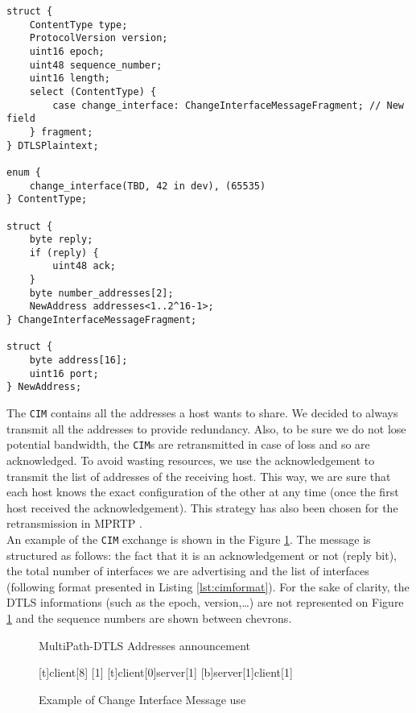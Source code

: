 \begin{lstlisting}[caption=Change Interface Message structure, label=lst:cimformat]
struct {
    ContentType type;
    ProtocolVersion version;
    uint16 epoch;
    uint48 sequence_number;
    uint16 length;
    select (ContentType) {
        case change_interface: ChangeInterfaceMessageFragment; // New field
    } fragment;
} DTLSPlaintext;

enum {
    change_interface(TBD, 42 in dev), (65535)
} ContentType;

struct {
    byte reply;
    if (reply) {
        uint48 ack;
    }
    byte number_addresses[2];
    NewAddress addresses<1..2^16-1>;
} ChangeInterfaceMessageFragment;

struct {
    byte address[16];
    uint16 port;
} NewAddress;
\end{lstlisting}

The \texttt{CIM} contains all the addresses a host wants to share. We decided to always transmit all the addresses to provide redundancy. Also, to be sure we do not lose potential bandwidth, the \texttt{CIM}s are retransmitted in case of loss and so are acknowledged. To avoid wasting resources, we use the acknowledgement to transmit the list of addresses of the receiving host. This way, we are sure that each host knows the exact configuration of the other at any time (once the first host received the acknowledgement). This strategy has also been chosen for the retransmission in MPRTP \cite{singh-avtcore-mprtp}.\\

An example of the \texttt{CIM} exchange is shown in the Figure \ref{fig:CIMexchange}. The message is structured as follows: the fact that it is an acknowledgement or not (reply bit), the total number of interfaces we are advertising and the list of interfaces (following format presented in Listing \ref{lst:cimformat}). For the sake of clarity, the DTLS informations (such as the epoch, version,\dots) are not represented on Figure \ref{fig:CIMexchange} and the sequence numbers are shown between chevrons.

\begin{figure}[!h]
\centering
\begin{msc}[r]{MultiPath-DTLS Addresses announcement}

\setlength{\instfootheight}{0em}
\setlength{\instheadheight}{0em}
\setlength{\instdist}{0.7\linewidth}
\setlength{\levelheight}{3em}


[t]{}{client}[8]
[1]
\nextlevel
{}[t]{client}[0]{server}[1]
\nextlevel
{}[b]{server}[1]{client}[1]
\nextlevel
\nextlevel

\end{msc}
\caption{Example of Change Interface Message use}
\label{fig:CIMexchange}
\end{figure}

